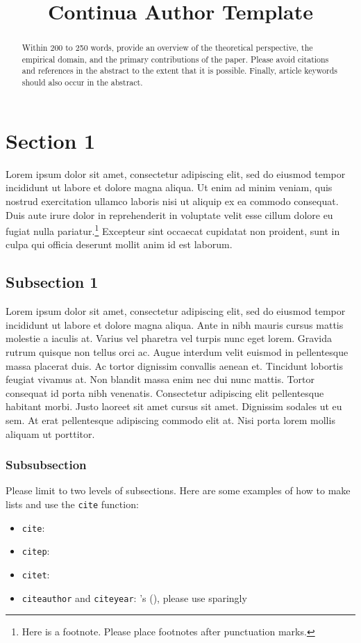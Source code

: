 \documentclass[
  journal=Notes,
  manuscript=for-review,
  year=2023,
  volume=x:x,
]{continua-journal}
\title{Continua Author Template}
\begin{document}
\begin{abstract}
Within 200 to 250 words, provide an overview of the theoretical perspective, the empirical domain, and the primary contributions of the paper. Please avoid citations and references in the abstract to the extent that it is possible. Finally, article keywords should also occur in the abstract.
\end{abstract}

\section{Section 1}
Lorem ipsum dolor sit amet, consectetur adipiscing elit, sed do eiusmod tempor incididunt ut labore et dolore magna aliqua. Ut enim ad minim veniam, quis nostrud exercitation ullamco laboris nisi ut aliquip ex ea commodo consequat. Duis aute irure dolor in reprehenderit in voluptate velit esse cillum dolore eu fugiat nulla pariatur.\footnote{Here is a footnote. Please place footnotes after punctuation marks.} Excepteur sint occaecat cupidatat non proident, sunt in culpa qui officia deserunt mollit anim id est laborum. 

\subsection{Subsection 1}
Lorem ipsum dolor sit amet, consectetur adipiscing elit, sed do eiusmod tempor incididunt ut labore et dolore magna aliqua. Ante in nibh mauris cursus mattis molestie a iaculis at. Varius vel pharetra vel turpis nunc eget lorem. Gravida rutrum quisque non tellus orci ac. Augue interdum velit euismod in pellentesque massa placerat duis. Ac tortor dignissim convallis aenean et. Tincidunt lobortis feugiat vivamus at. Non blandit massa enim nec dui nunc mattis. Tortor consequat id porta nibh venenatis. Consectetur adipiscing elit pellentesque habitant morbi. Justo laoreet sit amet cursus sit amet. Dignissim sodales ut eu sem. At erat pellentesque adipiscing commodo elit at. Nisi porta lorem mollis aliquam ut porttitor.

\subsubsection{Subsubsection}
Please limit to two levels of subsections. Here are some examples of how to make lists and use the \texttt{cite} function:
\begin{itemize}
    \item \texttt{cite}: \cite{natvigsalmons2020}
    \item \texttt{citep}: \citep[27--29]{adger2011}
    \item \texttt{citet}: \citet[3]{chomsky65}
    \item \texttt{citeauthor} and \texttt{citeyear}: \citeauthor{halle1993}'s (\citeyear{halle1993}), please use sparingly
\end{itemize}
\end{document}
